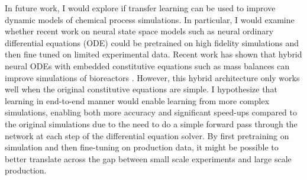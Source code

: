 In future work, I would explore if transfer learning can be used to improve dynamic models of chemical process simulations. In particular, I would examine whether recent work on neural state space models such as neural ordinary differential equations (ODE) \cite{Chen2018} could be pretrained on high fidelity simulations and then fine tuned on limited experimental data. Recent work has shown that hybrid neural ODEs with embedded constitutive equations such as mass balances can improve simulations of bioreactors \cite{Bangi2022}. However, this hybrid architecture only works well when the original constitutive equations are simple. I hypothesize that learning in end-to-end manner would enable learning from more complex simulations, enabling both more accuracy and significant speed-ups compared to the original simulations due to the need to do a simple forward pass through the network at each step of the differential equation solver. By first pretraining on simulation and then fine-tuning on production data, it might be possible to better translate across the gap between small scale experiments and large scale production.





